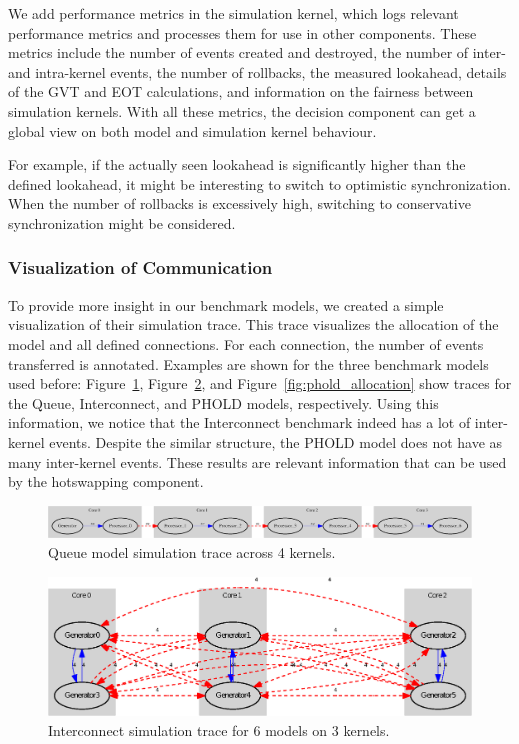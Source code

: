We add performance metrics in the simulation kernel, which logs relevant performance metrics and processes them for use in other components.
These metrics include the number of events created and destroyed, the number of inter- and intra-kernel events, the number of rollbacks, the measured lookahead, details of the GVT and EOT calculations, and information on the fairness between simulation kernels.
With all these metrics, the decision component can get a global view on both model and simulation kernel behaviour.

For example, if the actually seen lookahead is significantly higher than the defined lookahead, it might be interesting to switch to optimistic synchronization.
When the number of rollbacks is excessively high, switching to conservative synchronization might be considered.

\subsubsection{Visualization of Communication}
To provide more insight in our benchmark models, we created a simple visualization of their simulation trace.
This trace visualizes the allocation of the model and all defined connections.
For each connection, the number of events transferred is annotated.
Examples are shown for the three benchmark models used before: Figure~\ref{fig:Queue_allocation}, Figure~\ref{fig:interconnect_allocation_parallel}, and Figure~\ref{fig:phold_allocation} show traces for the Queue, Interconnect, and PHOLD models, respectively.
Using this information, we notice that the Interconnect benchmark indeed has a lot of inter-kernel events.
Despite the similar structure, the PHOLD model does not have as many inter-kernel events.
These results are relevant information that can be used by the hotswapping component.

\begin{figure}
    \center
    \includegraphics[width=\textwidth ]{fig/queue_allocation.eps}
    \caption{Queue model simulation trace across 4 kernels.}
    \label{fig:Queue_allocation}
\end{figure}

\begin{figure}
    \center
    \includegraphics[width=\plotfraction\columnwidth]{fig/interconnect_parallel_allocation.eps}
    \caption{Interconnect simulation trace for 6 models on 3 kernels.}
    \label{fig:interconnect_allocation_parallel}
\end{figure}


